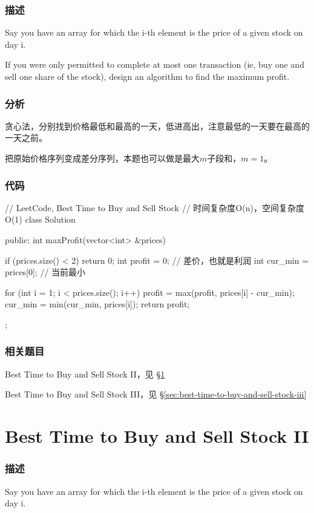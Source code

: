\subsubsection{描述}
Say you have an array for which the i-th element is the price of a given stock on day i.

If you were only permitted to complete at    most one transaction (ie, buy one and sell one share of the stock), design an algorithm to find the maximum profit.


\subsubsection{分析}
贪心法，分别找到价格最低和最高的一天，低进高出，注意最低的一天要在最高的一天之前。

把原始价格序列变成差分序列，本题也可以做是最大$m$子段和，$m=1$。

\subsubsection{代码}
\begin{Code}
	// LeetCode, Best Time to Buy and Sell Stock
	// 时间复杂度O(n)，空间复杂度O(1)
	class Solution {
		public:
		int maxProfit(vector<int> &prices) {
			if (prices.size() < 2) return 0;
			int profit = 0;  // 差价，也就是利润
			int cur_min = prices[0]; // 当前最小
			
			for (int i = 1; i < prices.size(); i++) {
				profit = max(profit, prices[i] - cur_min);
				cur_min = min(cur_min, prices[i]);
			}
			return profit;
		}
	};
\end{Code}


\subsubsection{相关题目}
\begindot
\item Best Time to Buy and Sell Stock II，见 \S \ref{sec:best-time-to-buy-and-sell-stock-ii}
\item Best Time to Buy and Sell Stock III，见 \S \ref{sec:best-time-to-buy-and-sell-stock-iii}
\myenddot


\section{Best Time to Buy and Sell Stock II} %
\label{sec:best-time-to-buy-and-sell-stock-ii}


\subsubsection{描述}
Say you have an array for which the i-th element is the price of a given stock on day i.

